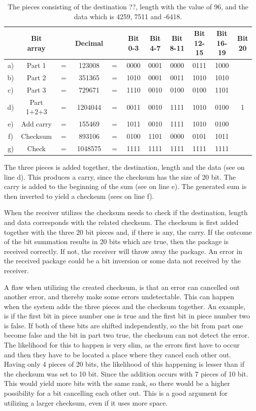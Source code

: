 \begin{table}[H]
\centering
\begin{tabular}{c c c c c c c c c c c}
   & Bit array  &     & Decimal &     & Bit 0-3 & Bit 4-7 & Bit 8-11 & Bit 12-15 & Bit 16-19 & Bit 20 \\
\hline
a) & Part 1     & $=$ & 123008  & $=$ & 0000 & 0001 & 0000 & 0111 & 1000 & \\
b) & Part 2     & $=$ & 351365  & $=$ & 1010 & 0001 & 0011 & 1010 & 1010 & \\
c) & Part 3     & $=$ & 729671  & $=$ & 1110 & 0010 & 0100 & 0100 & 1101 & \\
d) & Part 1+2+3 & $=$ & 1204044 & $=$ & 0011 & 0010 & 1111 & 1010 & 0100 & 1 \\
e) & Add carry  & $=$ & 155469  & $=$ & 1011 & 0010 & 1111 & 1010 & 0100 & \\
f) & Checksum   & $=$ & 893106  & $=$ & 0100 & 1101 & 0000 & 0101 & 1011 & \\
g) & Check      & $=$ & 1048575 & $=$ & 1111 & 1111 & 1111 & 1111 & 1111 & \\
\end{tabular}
\caption{The pieces consisting of the destination ??, length with the value of 96, and the data which is 4259, 7511 and -6418.}
\label{ChecksumExp}
\end{table}

The three pieces is added together, the destination, length and the data (see on line d). This produces a carry, since the checksum has the size of 20 bit. The carry is added to the beginning of the sum (see on line e). The generated sum is then inverted to yield a checksum (sees on line f).

When the receiver utilizes the checksum needs to check if the destination, length and data corresponds with the related checksum. The checksum is first added together with the three 20 bit pieces and, if there is any, the carry. If the outcome of the bit summation results in 20 bits which are true, then the package is received correctly. If not, the receiver will throw away the package. An error in the received package could be a bit inversion or some data not received by the receiver. 

A flaw when utilizing the created checksum, is that an error can cancelled out another error, and thereby make some errors undetectable. This can happen when the system adds the three pieces and the checksum together. An example, is if the first bit in piece number one is true and the first bit in piece number two is false. If both of these bits are shifted independently, so the bit from part one become false and the bit in part two true, the checksum can not detect the error. The likelihood for this to happen is very slim, as the errors first have to occur and then they have to be located a place where they cancel each other out. Having only 4 pieces of 20 bits, the likelihood of this happening is lesser than if the checksum was set to 10 bit. Since the addition occurs with 7 pieces of 10 bit. This would yield more bits with the same rank, so there would be a higher possibility for a bit cancelling each other out. This is a good argument for utilizing a larger checksum, even if it uses more space.

